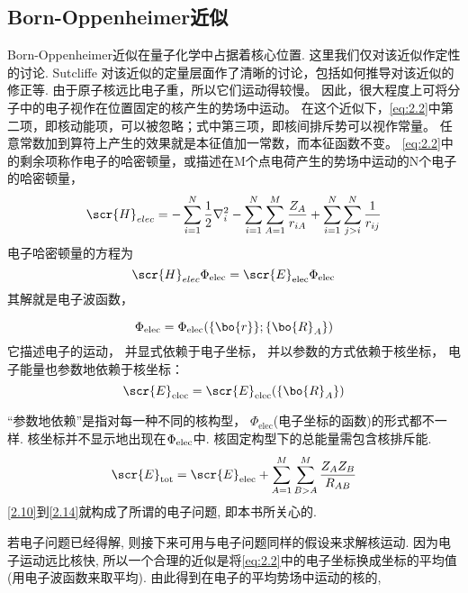 \subsection{Born-Oppenheimer近似}
\label{sec2.1.2}
Born-Oppenheimer近似在量子化学中占据着核心位置.
这里我们仅对该近似作定性的讨论. Sutcliffe
对该近似的定量层面作了清晰的讨论，包括如何推导对该近似的修正等. 
由于原子核远比电子重，所以它们运动得较慢。
因此，很大程度上可将分子中的电子视作在位置固定的核产生的势场中运动。
在这个近似下，\autoref{eq:2.2}中第二项，即核动能项，可以被忽略；式中第三项，即核间排斥势可以视作常量。
任意常数加到算符上产生的效果就是本征值加一常数，而本征函数不变。
\autoref{eq:2.2}中的剩余项称作电子的哈密顿量，或描述在M个点电荷产生的势场中运动的N个电子的哈密顿量，
\begin{equation}
\label{2.10}
\scr{H}_{elec}=-\sum_{i=1}^{N}\frac{1}{2}\nabla_i^2 - \sum_{i=1}^{N}\sum_{A=1}^{M}\frac{Z_A}{r_{iA}} + \sum_{i=1}^{N}\sum_{j>i}^{N}\frac{1}{r_{ij}}
\end{equation}
电子哈密顿量的\sch 方程为
\begin{equation}
\label{2.11}
\scr{H}_{elec\rm}\Phi_{\rm elec}=\scr{E}_{\rm elec}\Phi_{\rm elec}
\end{equation}
其解就是电子波函数，

\begin{equation}
\label{2.12}
\Phi_{\rm elec}=\Phi_{\rm elec}(\{\bo{r}\};\{\bo{R}_A\})
\end{equation}
它描述电子的运动，
并显式依赖于电子坐标，
并以参数的方式依赖于核坐标，
电子能量也参数地依赖于核坐标：
\begin{equation}
\label{2.13}
\scr{E}_{\rm elec}=\scr{E}_{\rm elec}(\{\bo{R}_A\})
\end{equation}

“参数地依赖”是指对每一种不同的核构型，
$\Phi_\mathrm{elec}$(电子坐标的函数)的形式都不一样. 
核坐标并不显示地出现在$\Phi_{\rm elec}$中. 
核固定构型下的总能量需包含核排斥能.
\begin{equation}
\label{2.14}
\scr{E}_{\rm tot}=\scr{E}_{\rm elec}+\sum_{A=1}^{M}\sum_{B>A}^M\frac{Z_AZ_B}{R_{AB}}
\end{equation}
\autoref{2.10}到\autoref{2.14}就构成了所谓的电子问题, 
即本书所关心的.


若电子问题已经得解, 
则接下来可用与电子问题同样的假设来求解核运动. 
因为电子运动远比核快, 
所以一个合理的近似是将\autoref{eq:2.2}中的电子坐标换成坐标的平均值(用电子波函数来取平均). 
由此得到在电子的平均势场中运动的核的\ha,

